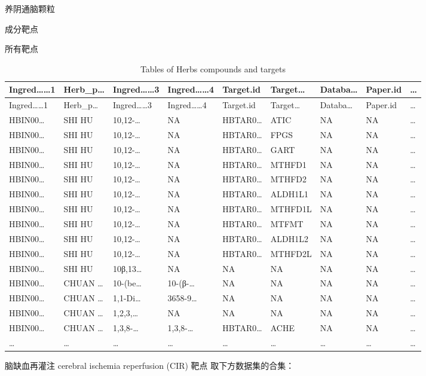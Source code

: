 \documentclass[
  ignorenonframetext,
]{beamer}
\begin{document}
\begin{frame}[fragile]{养阴通脑颗粒}
\begin{block}{成分靶点}
\begin{block}{所有靶点}
\begin{longtable}[]{@{}lllllllll@{}}
\caption{Tables of Herbs compounds and targets}\tabularnewline
\toprule
Ingred\ldots\ldots1 & Herb\_p\ldots{} & Ingred\ldots\ldots3 &
Ingred\ldots\ldots4 & Target.id & Target\ldots{} & Databa\ldots{} &
Paper.id & \ldots{}\tabularnewline
\midrule
\endfirsthead
\toprule
Ingred\ldots\ldots1 & Herb\_p\ldots{} & Ingred\ldots\ldots3 &
Ingred\ldots\ldots4 & Target.id & Target\ldots{} & Databa\ldots{} &
Paper.id & \ldots{}\tabularnewline
\midrule
\endhead
HBIN00\ldots{} & SHI HU & 10,12-\ldots{} & NA & HBTAR0\ldots{} & ATIC &
NA & NA & \ldots{}\tabularnewline
HBIN00\ldots{} & SHI HU & 10,12-\ldots{} & NA & HBTAR0\ldots{} & FPGS &
NA & NA & \ldots{}\tabularnewline
HBIN00\ldots{} & SHI HU & 10,12-\ldots{} & NA & HBTAR0\ldots{} & GART &
NA & NA & \ldots{}\tabularnewline
HBIN00\ldots{} & SHI HU & 10,12-\ldots{} & NA & HBTAR0\ldots{} & MTHFD1
& NA & NA & \ldots{}\tabularnewline
HBIN00\ldots{} & SHI HU & 10,12-\ldots{} & NA & HBTAR0\ldots{} & MTHFD2
& NA & NA & \ldots{}\tabularnewline
HBIN00\ldots{} & SHI HU & 10,12-\ldots{} & NA & HBTAR0\ldots{} & ALDH1L1
& NA & NA & \ldots{}\tabularnewline
HBIN00\ldots{} & SHI HU & 10,12-\ldots{} & NA & HBTAR0\ldots{} & MTHFD1L
& NA & NA & \ldots{}\tabularnewline
HBIN00\ldots{} & SHI HU & 10,12-\ldots{} & NA & HBTAR0\ldots{} & MTFMT &
NA & NA & \ldots{}\tabularnewline
HBIN00\ldots{} & SHI HU & 10,12-\ldots{} & NA & HBTAR0\ldots{} & ALDH1L2
& NA & NA & \ldots{}\tabularnewline
HBIN00\ldots{} & SHI HU & 10,12-\ldots{} & NA & HBTAR0\ldots{} & MTHFD2L
& NA & NA & \ldots{}\tabularnewline
HBIN00\ldots{} & SHI HU & 10β,13\ldots{} & NA & NA & NA & NA & NA &
\ldots{}\tabularnewline
HBIN00\ldots{} & CHUAN \ldots{} & 10-(be\ldots{} & 10-(β-\ldots{} & NA &
NA & NA & NA & \ldots{}\tabularnewline
HBIN00\ldots{} & CHUAN \ldots{} & 1,1-Di\ldots{} & 3658-9\ldots{} & NA &
NA & NA & NA & \ldots{}\tabularnewline
HBIN00\ldots{} & CHUAN \ldots{} & 1,2,3,\ldots{} & NA & NA & NA & NA &
NA & \ldots{}\tabularnewline
HBIN00\ldots{} & CHUAN \ldots{} & 1,3,8-\ldots{} & 1,3,8-\ldots{} &
HBTAR0\ldots{} & ACHE & NA & NA & \ldots{}\tabularnewline
\ldots{} & \ldots{} & \ldots{} & \ldots{} & \ldots{} & \ldots{} &
\ldots{} & \ldots{} & \ldots{}\tabularnewline
\bottomrule
\end{longtable}
\end{block}
\end{block}

\begin{block}{脑缺血再灌注 cerebral ischemia reperfusion (CIR) 靶点}
\protect\hypertarget{ux8111ux7f3aux8840ux518dux704cux6ce8-cerebral-ischemia-reperfusion-cir-ux9776ux70b9}{}
取下方数据集的合集：


\end{block}
\end{frame}
\end{document}
